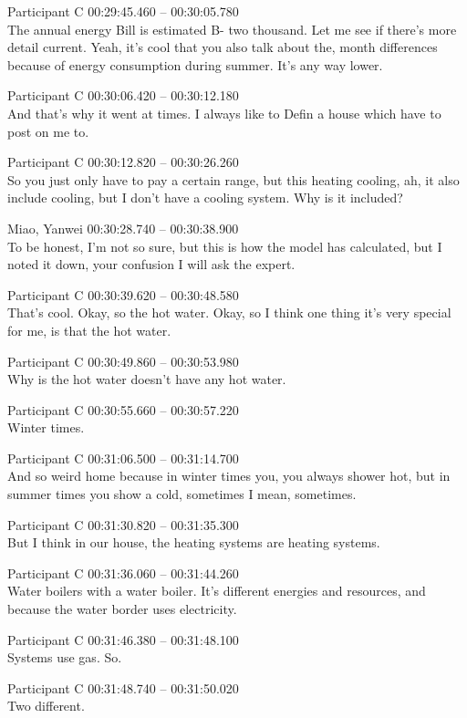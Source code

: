 {Participant C 00:29:45.460 -- 00:30:05.780 \\
The annual energy Bill is estimated B- two thousand. Let me see if there's more detail current. Yeah, it's cool that you also talk about the, month differences because of energy consumption during summer. It's any way lower.

Participant C 00:30:06.420 -- 00:30:12.180 \\
And that's why it went at times. I always like to Defin a house which have to post on me to.

Participant C 00:30:12.820 -- 00:30:26.260 \\
So you just only have to pay a certain range, but this heating cooling, ah, it also include cooling, but I don't have a cooling system. Why is it included?

Miao, Yanwei 00:30:28.740 -- 00:30:38.900 \\
To be honest, I'm not so sure, but this is how the model has calculated, but I noted it down, your confusion I will ask the expert.

Participant C 00:30:39.620 -- 00:30:48.580 \\
That's cool. Okay, so the hot water. Okay, so I think one thing it's very special for me, is that the hot water.

Participant C 00:30:49.860 -- 00:30:53.980 \\
Why is the hot water doesn't have any hot water.

Participant C 00:30:55.660 -- 00:30:57.220 \\
Winter times.

Participant C 00:31:06.500 -- 00:31:14.700 \\
And so weird home because in winter times you, you always shower hot, but in summer times you show a cold, sometimes I mean, sometimes.

Participant C 00:31:30.820 -- 00:31:35.300 \\
But I think in our house, the heating systems are heating systems.

Participant C 00:31:36.060 -- 00:31:44.260 \\
Water boilers with a water boiler. It's different energies and resources, and because the water border uses electricity.

Participant C 00:31:46.380 -- 00:31:48.100 \\
Systems use gas. So.

Participant C 00:31:48.740 -- 00:31:50.020 \\
Two different.

}

